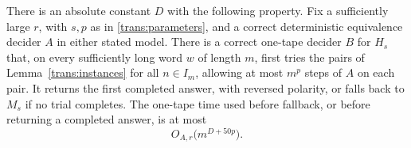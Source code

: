 \begin{lemma}
\label{trans:cutoff}
There is an absolute constant $D$ with the following property. Fix a
sufficiently large $r$, with $s,p$ as in \eqref{trans:parameters}, and a
correct deterministic equivalence decider $A$ in either stated model.
There is a correct one-tape decider $B$ for $H_s$ that, on every sufficiently
long word $w$ of length $m$, first tries the pairs of
Lemma~\ref{trans:instances} for all $n\in I_m$, allowing at most $m^p$
steps of $A$ on each pair. It returns the first completed answer, with
reversed polarity, or falls back to $M_s$ if no trial completes. The
one-tape time used before fallback, or before returning a completed answer,
is at most
\begin{equation}
\label{trans:cutoff-cost}
  O_{A,r}\bigl(m^{D+50p}\bigr).
\end{equation}
\end{lemma}

